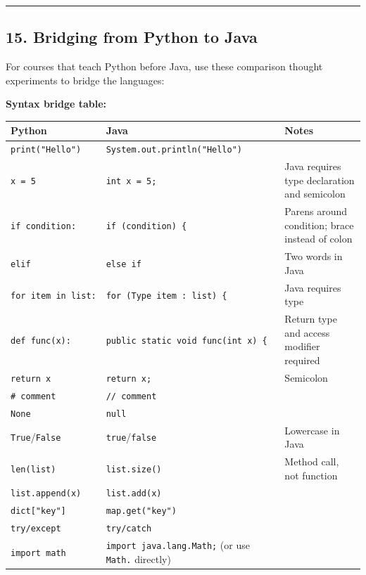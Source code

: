 \documentclass[
  justified,
  openright,
]{tufte-book}
\begin{document}
\begin{center}\rule{0.5\linewidth}{0.5pt}\end{center}

\subsection{15. Bridging from Python to
Java}\label{bridging-from-python-to-java}

For courses that teach Python before Java, use these comparison thought
experiments to bridge the languages:

\textbf{Syntax bridge table:}

{\def\LTcaptype{none} %
\begin{longtable}[]{@{}
  >{\raggedright\arraybackslash}p{}
  >{\raggedright\arraybackslash}p{}
  >{\raggedright\arraybackslash}p{}@{}}
\toprule\noalign{}
\begin{minipage}[b]{\linewidth}\raggedright
Python
\end{minipage} & \begin{minipage}[b]{\linewidth}\raggedright
Java
\end{minipage} & \begin{minipage}[b]{\linewidth}\raggedright
Notes
\end{minipage} \\
\midrule\noalign{}
\endhead
\bottomrule\noalign{}
\endlastfoot
\texttt{print("Hello")} & \texttt{System.out.println("Hello")} & \\
\texttt{x\ =\ 5} & \texttt{int\ x\ =\ 5;} & Java requires type
declaration and semicolon \\
\texttt{if\ condition:} & \texttt{if\ (condition)\ \{} & Parens around
condition; brace instead of colon \\
\texttt{elif} & \texttt{else\ if} & Two words in Java \\
\texttt{for\ item\ in\ list:} & \texttt{for\ (Type\ item\ :\ list)\ \{}
& Java requires type \\
\texttt{def\ func(x):} & \texttt{public\ static\ void\ func(int\ x)\ \{}
& Return type and access modifier required \\
\texttt{return\ x} & \texttt{return\ x;} & Semicolon \\
\texttt{\#\ comment} & \texttt{//\ comment} & \\
\texttt{None} & \texttt{null} & \\
\texttt{True}/\texttt{False} & \texttt{true}/\texttt{false} & Lowercase
in Java \\
\texttt{len(list)} & \texttt{list.size()} & Method call, not function \\
\texttt{list.append(x)} & \texttt{list.add(x)} & \\
\texttt{dict{[}"key"{]}} & \texttt{map.get("key")} & \\
\texttt{try/except} & \texttt{try/catch} & \\
\texttt{import\ math} & \texttt{import\ java.lang.Math;} (or use
\texttt{Math.} directly) & \\
\end{longtable}
}
\end{document}
